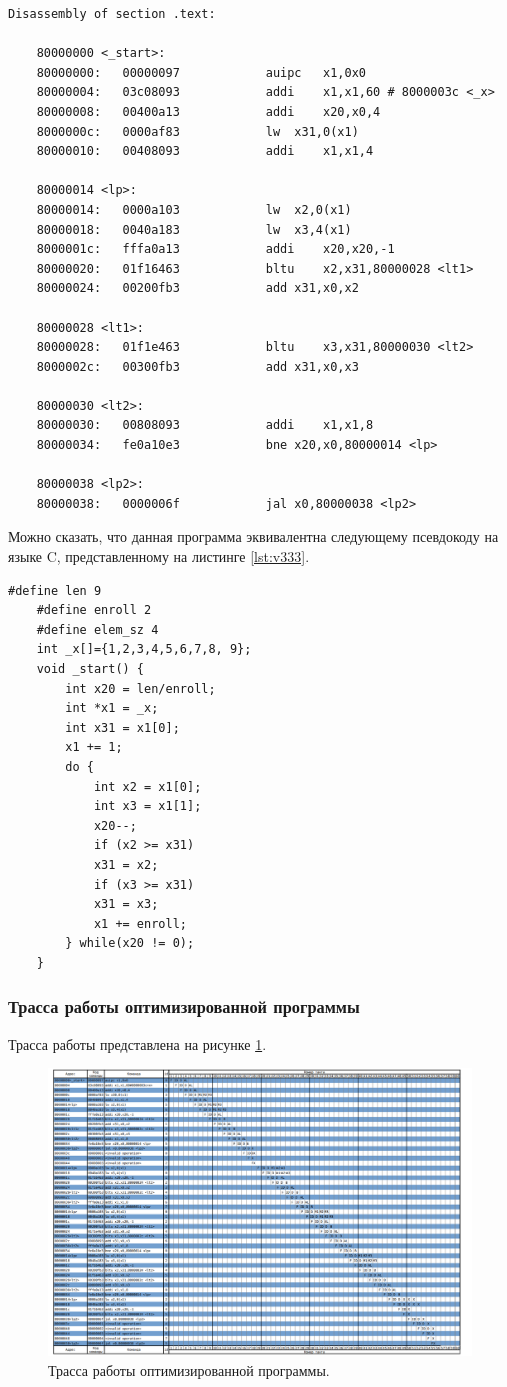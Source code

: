 \begin{lstlisting}[label=lst:v222,caption=Дизассемблированный код (оптимизированный)]
	Disassembly of section .text:
	
	80000000 <_start>:
	80000000:	00000097          	auipc	x1,0x0
	80000004:	03c08093          	addi	x1,x1,60 # 8000003c <_x>
	80000008:	00400a13          	addi	x20,x0,4
	8000000c:	0000af83          	lw	x31,0(x1)
	80000010:	00408093          	addi	x1,x1,4
	
	80000014 <lp>:
	80000014:	0000a103          	lw	x2,0(x1)
	80000018:	0040a183          	lw	x3,4(x1)
	8000001c:	fffa0a13          	addi	x20,x20,-1
	80000020:	01f16463          	bltu	x2,x31,80000028 <lt1>
	80000024:	00200fb3          	add	x31,x0,x2
	
	80000028 <lt1>:
	80000028:	01f1e463          	bltu	x3,x31,80000030 <lt2>
	8000002c:	00300fb3          	add	x31,x0,x3
	
	80000030 <lt2>:
	80000030:	00808093          	addi	x1,x1,8
	80000034:	fe0a10e3          	bne	x20,x0,80000014 <lp>
	
	80000038 <lp2>:
	80000038:	0000006f          	jal	x0,80000038 <lp2>
\end{lstlisting}
\clearpage

Можно сказать, что данная программа эквивалентна следующему псевдокоду на языке C, представленному на листинге \ref{lst:v333}.

\begin{lstlisting}[label=lst:v333,caption=Псевдокод программы (оптимизированный)]
	#define len 9
	#define enroll 2
	#define elem_sz 4
	int _x[]={1,2,3,4,5,6,7,8, 9};
	void _start() {
		int x20 = len/enroll;
		int *x1 = _x;
		int x31 = x1[0];
		x1 += 1;
		do {
			int x2 = x1[0];
			int x3 = x1[1];
			x20--;
			if (x2 >= x31)
			x31 = x2;
			if (x3 >= x31)
			x31 = x3;
			x1 += enroll;
		} while(x20 != 0);
	}
\end{lstlisting}

\clearpage

\subsubsection*{Трасса работы оптимизированной программы}
Трасса работы представлена на рисунке \ref{img:pipeline_op}.

\begin{figure}[h]
	\centering
	\includegraphics[height=0.48\textheight]{img/pipeline_op}
	\caption{Трасса работы оптимизированной программы.}
	\label{img:pipeline_op}
\end{figure}

